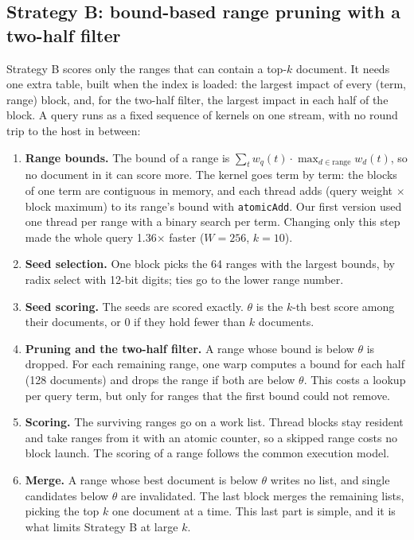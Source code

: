 \documentclass[11pt]{article}
\begin{document}
\subsection{Strategy B: bound-based range pruning with a two-half filter}
Strategy B scores only the ranges that can contain a top-$k$ document. It needs one extra table, built when the
index is loaded: the largest impact of every (term, range) block, and, for the two-half filter, the largest
impact in each half of the block. A query runs as a fixed sequence of kernels on one stream, with no round trip
to the host in between:
\begin{enumerate}
\item \textbf{Range bounds.} The bound of a range is $\sum_t w_q(t)\cdot\max_{d\in\text{range}} w_d(t)$, so no
  document in it can score more. The kernel goes term by term: the blocks of one term are contiguous in memory,
  and each thread adds (query weight $\times$ block maximum) to its range's bound with \texttt{atomicAdd}. Our
  first version used one thread per range with a binary search per term. Changing only this step made the whole
  query 1.36$\times$ faster ($W=256$, $k=10$).
\item \textbf{Seed selection.} One block picks the 64 ranges with the largest bounds, by radix select with 12-bit
  digits; ties go to the lower range number.
\item \textbf{Seed scoring.} The seeds are scored exactly. $\theta$ is the $k$-th best score among their
  documents, or 0 if they hold fewer than $k$ documents.
\item \textbf{Pruning and the two-half filter.} A range whose bound is below $\theta$ is dropped. For each
  remaining range, one warp computes a bound for each half (128 documents) and drops the range if both are below
  $\theta$. This costs a lookup per query term, but only for ranges that the first bound could not remove.
\item \textbf{Scoring.} The surviving ranges go on a work list. Thread blocks stay resident and take ranges from
  it with an atomic counter, so a skipped range costs no block launch. The scoring of a range follows the
  common execution model.
\item \textbf{Merge.} A range whose best document is below $\theta$ writes no list, and single candidates below
  $\theta$ are invalidated. The last block merges the remaining lists, picking the top $k$ one document at a
  time. This last part is simple, and it is what limits Strategy B at large $k$.
\end{enumerate}
\end{document}
